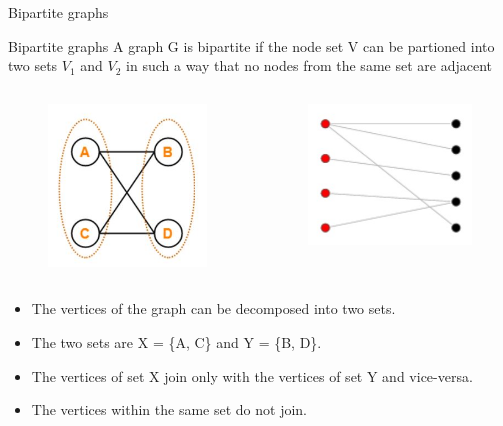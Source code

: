 \documentclass{beamer}
\begin{document}
\begin{frame}{Bipartite graphs}
	\begin{block}{Bipartite graphs}
		A graph G is bipartite if the node set V can be partioned into two sets $V_1$ and $V_2$ in such a way that no nodes from the same set are adjacent
	\end{block}
\begin{columns}
	\begin{column}{.5\textwidth}
			\begin{figure}
			\includegraphics[scale=.5]{img/m15}
		\end{figure}
	\end{column}
		\begin{column}{.5\textwidth}
		\begin{figure}
			\includegraphics[scale=.5]{img/m39}
		\end{figure}
	\end{column}
	
\end{columns}

\begin{itemize}
	\item The vertices of the graph can be decomposed into two sets.
	\item The two sets are X = \{A, C\} and Y = \{B, D\}.
	\item The vertices of set X join only with the vertices of set Y and vice-versa.
	\item The vertices within the same set do not join.
\end{itemize}
\end{frame}
\end{document}
